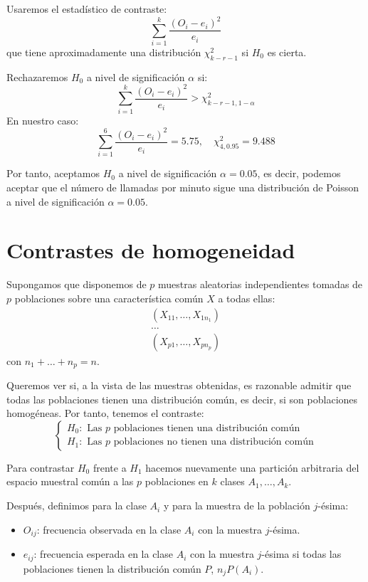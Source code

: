 \begin{example}
    Usaremos el estadístico de contraste:
    $$\sum_{i=1}^k \frac{(O_i-e_i)^2}{e_i}$$
    que tiene aproximadamente una distribución $\chi^2_{k-r-1}$ si $H_0$ es cierta.

    Rechazaremos $H_0$ a nivel de significación $\alpha$ si:
    $$\sum_{i=1}^k \frac{(O_i-e_i)^2}{e_i} > \chi^2_{k-r-1, 1-\alpha}$$
    En nuestro caso:
    $$\sum_{i=1}^6 \frac{(O_i-e_i)^2}{e_i} = 5.75, \quad \chi^2_{4, 0.95} = 9.488$$

    Por tanto, aceptamos $H_0$ a nivel de significación $\alpha = 0.05$, es decir, podemos aceptar que el número de llamadas por minuto sigue una distribución de Poisson a nivel de significación $\alpha = 0.05$.
\end{example}

\section{Contrastes de homogeneidad}
Supongamos que disponemos de $p$ muestras aleatorias independientes tomadas de $p$ poblaciones sobre una característica común $X$ a todas ellas:
\begin{align*}
    (X_{11}, \dots, X_{1n_1}) \\
    \dots                     \\
    (X_{p1}, \dots, X_{pn_p})
\end{align*}
con $n_1 + \dots + n_p = n$.

Queremos ver si, a la vista de las muestras obtenidas, es razonable admitir que todas las poblaciones tienen una distribución común, es decir, si son poblaciones homogéneas.
Por tanto, tenemos el contraste:
$$\begin{cases}
        H_0: \text{ Las } p \text{ poblaciones tienen una distribución común} \\
        H_1: \text{ Las } p \text{ poblaciones no tienen una distribución común}
    \end{cases}$$

Para contrastar $H_0$ frente a $H_1$ hacemos nuevamente una partición arbitraria del espacio muestral común a las $p$ poblaciones en $k$ clases $A_1, \dots, A_k$.

Después, definimos para la clase $A_i$ y para la muestra de la población $j$-ésima:
\begin{itemize}
    \item $O_{ij}$: frecuencia observada en la clase $A_i$ con la muestra $j$-ésima.
    \item $e_{ij}$: frecuencia esperada en la clase $A_i$ con la muestra $j$-ésima si todas las poblaciones tienen la distribución común $P$, $n_jP(A_i)$.
\end{itemize}

